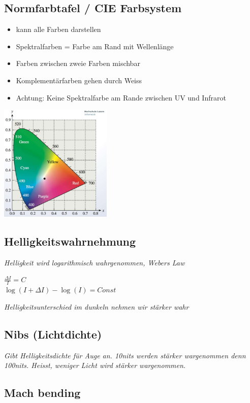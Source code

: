\subsection{Normfarbtafel / CIE Farbsystem}
\begin{itemize}
	\item kann alle Farben darstellen
	\item Spektralfarben = Farbe am Rand mit Wellenlänge
	\item Farben zwischen zweie Farben mischbar
	\item Komplementärfarben gehen durch Weiss
	\item Achtung: Keine Spektralfarbe am Rande zwischen UV und Infrarot
\end{itemize}

\includegraphics[width=0.4\textwidth]{assets/color-cie.png}

\subsection{Helligkeitswahrnehmung}

\textit{Helligkeit wird logarithmisch wahrgenommen, Webers Law}

$\frac{\Delta I}{I} = C$ \\
$\log (I + \Delta I) - \log(I) = Const$

\textit{Helligkeitsunterschied im dunkeln nehmen wir stärker wahr}
 
\subsection{Nibs (Lichtdichte)}

\textit{
    Gibt Helligkeitsdichte für Auge an. 10nits werden stärker wargenommen denn 100nits.
    Heisst, weniger Licht wird stärker wargenommen.
}

\subsection{Mach bending}

